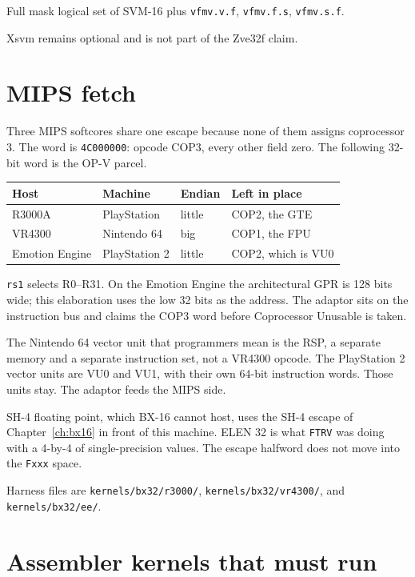 Full mask logical set of SVM-16 plus \texttt{vfmv.v.f}, \texttt{vfmv.f.s}, \texttt{vfmv.s.f}.

Xsvm remains optional and is not part of the Zve32f claim.

\section{MIPS fetch}

Three MIPS softcores share one escape because none of them assigns coprocessor 3. The word is \texttt{4C000000}: opcode COP3, every other field zero. The following 32-bit word is the OP-V parcel.

\begin{center}
\small
\begin{tabular}{@{}llll@{}}
\toprule
Host & Machine & Endian & Left in place \\
\midrule
R3000A & PlayStation & little & COP2, the GTE \\
VR4300 & Nintendo 64 & big & COP1, the FPU \\
Emotion Engine & PlayStation 2 & little & COP2, which is VU0 \\
\bottomrule
\end{tabular}
\end{center}

\texttt{rs1} selects R0--R31. On the Emotion Engine the architectural GPR is 128 bits wide; this elaboration uses the low 32 bits as the address. The adaptor sits on the instruction bus and claims the COP3 word before Coprocessor Unusable is taken.

The Nintendo 64 vector unit that programmers mean is the RSP, a separate memory and a separate instruction set, not a VR4300 opcode. The PlayStation 2 vector units are VU0 and VU1, with their own 64-bit instruction words. Those units stay. The adaptor feeds the MIPS side.

SH-4 floating point, which BX-16 cannot host, uses the SH-4 escape of Chapter~\ref{ch:bx16} in front of this machine. ELEN 32 is what \texttt{FTRV} was doing with a 4-by-4 of single-precision values. The escape halfword does not move into the \texttt{Fxxx} space.

Harness files are \texttt{kernels/bx32/r3000/}, \texttt{kernels/bx32/vr4300/}, and \texttt{kernels/bx32/ee/}.

\section{Assembler kernels that must run}

